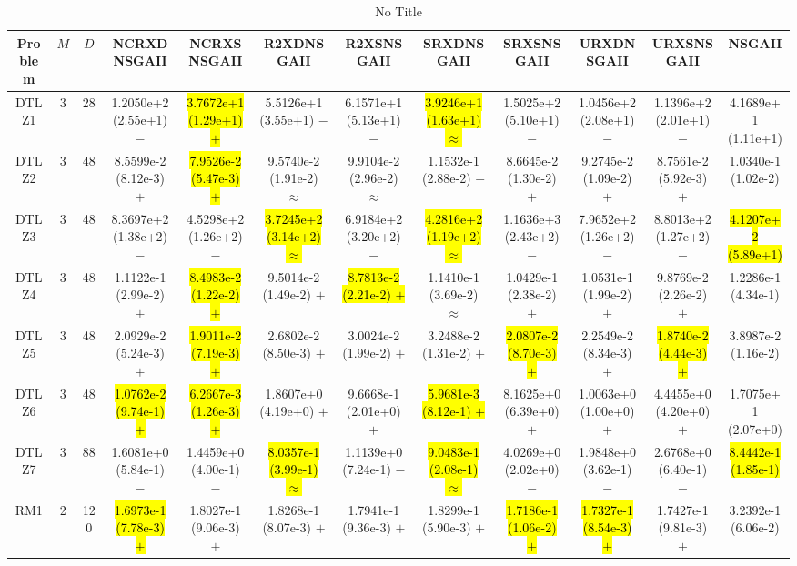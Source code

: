 \documentclass[journal]{IEEEtran}
\begin{document}
\begin{table*}[htbp]
\renewcommand{\arraystretch}{1.2}
\centering
\caption{No Title}
\begin{tabular}{cccccccccccc}
\toprule
Problem&$M$&$D$&NCRXDNSGAII&NCRXSNSGAII&R2XDNSGAII&R2XSNSGAII&SRXDNSGAII&SRXSNSGAII&URXDNSGAII&URXSNSGAII&NSGAII\\
\midrule
\multirow{1}{*}{DTLZ1}&3&28&1.2050e+2 (2.55e+1) $-$&\hl{3.7672e+1 (1.29e+1) $+$}&5.5126e+1 (3.55e+1) $-$&6.1571e+1 (5.13e+1) $-$&\hl{3.9246e+1 (1.63e+1) $\approx$}&1.5025e+2 (5.10e+1) $-$&1.0456e+2 (2.08e+1) $-$&1.1396e+2 (2.01e+1) $-$&4.1689e+1 (1.11e+1)\\
\hline
\multirow{1}{*}{DTLZ2}&3&48&8.5599e-2 (8.12e-3) $+$&\hl{7.9526e-2 (5.47e-3) $+$}&9.5740e-2 (1.91e-2) $\approx$&9.9104e-2 (2.96e-2) $\approx$&1.1532e-1 (2.88e-2) $-$&8.6645e-2 (1.30e-2) $+$&9.2745e-2 (1.09e-2) $+$&8.7561e-2 (5.92e-3) $+$&1.0340e-1 (1.02e-2)\\
\hline
\multirow{1}{*}{DTLZ3}&3&48&8.3697e+2 (1.38e+2) $-$&4.5298e+2 (1.26e+2) $-$&\hl{3.7245e+2 (3.14e+2) $\approx$}&6.9184e+2 (3.20e+2) $-$&\hl{4.2816e+2 (1.19e+2) $\approx$}&1.1636e+3 (2.43e+2) $-$&7.9652e+2 (1.26e+2) $-$&8.8013e+2 (1.27e+2) $-$&\hl{4.1207e+2 (5.89e+1)}\\
\hline
\multirow{1}{*}{DTLZ4}&3&48&1.1122e-1 (2.99e-2) $+$&\hl{8.4983e-2 (1.22e-2) $+$}&9.5014e-2 (1.49e-2) $+$&\hl{8.7813e-2 (2.21e-2) $+$}&1.1410e-1 (3.69e-2) $\approx$&1.0429e-1 (2.38e-2) $+$&1.0531e-1 (1.99e-2) $+$&9.8769e-2 (2.26e-2) $+$&1.2286e-1 (4.34e-1)\\
\hline
\multirow{1}{*}{DTLZ5}&3&48&2.0929e-2 (5.24e-3) $+$&\hl{1.9011e-2 (7.19e-3) $+$}&2.6802e-2 (8.50e-3) $+$&3.0024e-2 (1.99e-2) $+$&3.2488e-2 (1.31e-2) $+$&\hl{2.0807e-2 (8.70e-3) $+$}&2.2549e-2 (8.34e-3) $+$&\hl{1.8740e-2 (4.44e-3) $+$}&3.8987e-2 (1.16e-2)\\
\hline
\multirow{1}{*}{DTLZ6}&3&48&\hl{1.0762e-2 (9.74e-1) $+$}&\hl{6.2667e-3 (1.26e-3) $+$}&1.8607e+0 (4.19e+0) $+$&9.6668e-1 (2.01e+0) $+$&\hl{5.9681e-3 (8.12e-1) $+$}&8.1625e+0 (6.39e+0) $+$&1.0063e+0 (1.00e+0) $+$&4.4455e+0 (4.20e+0) $+$&1.7075e+1 (2.07e+0)\\
\hline
\multirow{1}{*}{DTLZ7}&3&88&1.6081e+0 (5.84e-1) $-$&1.4459e+0 (4.00e-1) $-$&\hl{8.0357e-1 (3.99e-1) $\approx$}&1.1139e+0 (7.24e-1) $-$&\hl{9.0483e-1 (2.08e-1) $\approx$}&4.0269e+0 (2.02e+0) $-$&1.9848e+0 (3.62e-1) $-$&2.6768e+0 (6.40e-1) $-$&\hl{8.4442e-1 (1.85e-1)}\\
\hline
\multirow{1}{*}{RM1}&2&120&\hl{1.6973e-1 (7.78e-3) $+$}&1.8027e-1 (9.06e-3) $+$&1.8268e-1 (8.07e-3) $+$&1.7941e-1 (9.36e-3) $+$&1.8299e-1 (5.90e-3) $+$&\hl{1.7186e-1 (1.06e-2) $+$}&\hl{1.7327e-1 (8.54e-3) $+$}&1.7427e-1 (9.81e-3) $+$&3.2392e-1 (6.06e-2)\\

\end{tabular}
\end{table*}
\end{document}
